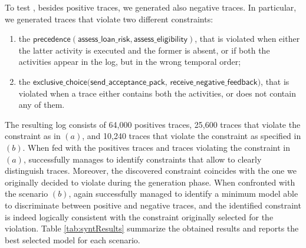 To test \nd, besides positive traces, we generated also negative traces. In particular, we generated traces that violate two different constraints:
\begin{enumerate}[label=(\textit{\alph*})]
\item the $\mathsf{precedence(assess\_loan\_risk, assess\_eligibility)}$, that is violated when either the latter activity is executed and the former is absent, or if both the activities appear in the log, but in the wrong temporal order;
%
\item the $\mathsf{exclusive\_choice(send\_acceptance\_pack}$, $\mathsf{receive\_negative\_feedback)}$, that is violated when a trace either contains both the activities, or does not contain any of them.
\end{enumerate}
%
The resulting log consists of 64,000 positives traces, 25,600 traces that violate the constraint as in $(a)$, and 10,240 traces that violate the constraint as specified in $(b)$.
%
When fed with the positives traces and traces violating the constraint in $(a)$, \nd successfully manages to identify constraints that allow to clearly distinguish traces. Moreover, the discovered constraint coincides with the one we originally decided to violate during the generation phase. When confronted with the scenario $(b)$, \nd again successfully managed to identify a minimum model able to discriminate between positive and negative traces, and the identified constraint is indeed logically consistent with the constraint originally selected for the violation.
Table \ref{tab:syntResults} summarize the obtained results and reports the best selected model for each scenario. 



